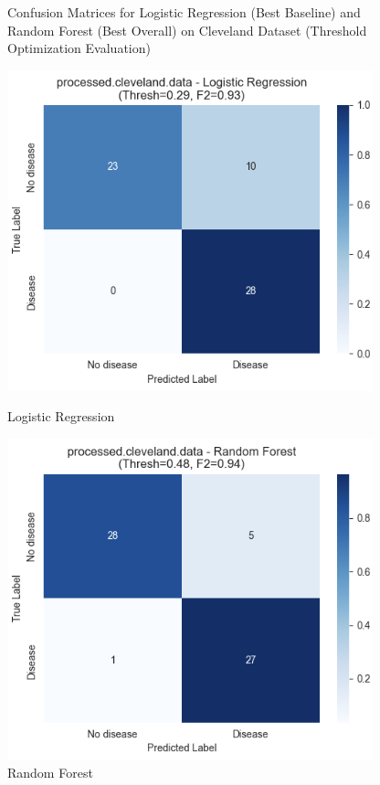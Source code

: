 \documentclass{article}
\begin{document}
\begin{figure}[htbp]
    \centering
    \caption{Confusion Matrices for Logistic Regression (Best Baseline) and Random Forest (Best Overall) on Cleveland Dataset (Threshold Optimization Evaluation)} %
    \label{fig:confusion_matrices_cleveland_lr_rf} %
    \begin{minipage}{0.48\textwidth} %
        \centering
        \includegraphics[width=\textwidth]{plots/Cleveland_Logistic_Regression_CM.png}
        \caption*{Logistic Regression} %
    \end{minipage}\hfill %
    \begin{minipage}{0.48\textwidth}
        \centering
        \includegraphics[width=\textwidth]{plots/Cleveland_Random_Forest_CM.png}
        \caption*{Random Forest}
    \end{minipage}
\end{figure}
\end{document}
